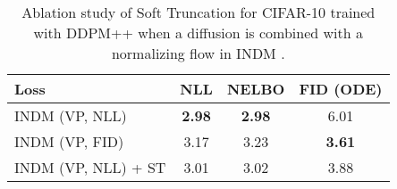 \documentclass[nohyperref]{article}
\theoremstyle{plain}
\theoremstyle{definition}
\theoremstyle{remark}
\begin{document}
\begin{table}[t]
\begin{minipage}[c]{0.5\textwidth}
\vskip 0.1in
\centering
\caption{Ablation study of Soft Truncation for CIFAR-10 trained with DDPM++ when a diffusion is combined with a normalizing flow in INDM \cite{kim2022maximum}.}
\label{tab:ablation_indm}
	\vskip -0.05in
\tiny
\begin{tabular}{lccc}
	\toprule
	Loss & NLL & NELBO & FID (ODE) \\\midrule
	INDM (VP, NLL) & \textbf{2.98} & \textbf{2.98} & 6.01 \\
	INDM (VP, FID) & 3.17 & 3.23 & \textbf{3.61} \\
	INDM (VP, NLL) + ST & 3.01 & 3.02 & 3.88 \\
	\bottomrule
\end{tabular}
\end{minipage}
\end{table}
\end{document}
